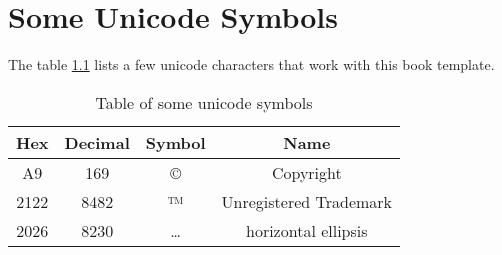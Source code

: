 \chapter{Some Unicode Symbols}
The table \ref{unicodeSymbols} lists a few unicode characters that work with this book template.

\begin{table}[h]
\centering
\begin{tabular}{|c c c c|}
\hline
Hex & Decimal & Symbol & Name \\
\hline\hline
A9 & 169 & © & Copyright \\
2122 & 8482 & ™ & Unregistered Trademark \\
2026 & 8230 & … & horizontal ellipsis \\
\hline
\end{tabular}
\caption{Table of some unicode symbols}
\label{unicodeSymbols}
\end{table}
